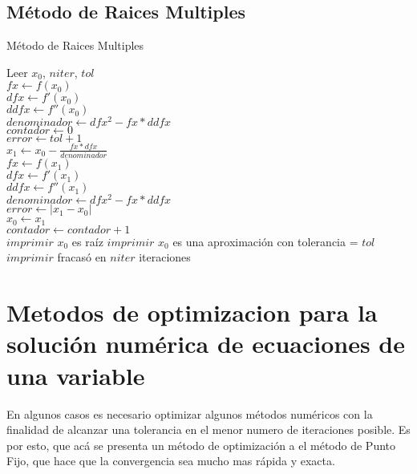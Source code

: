\documentclass[12pt]{article}
\begin{document}
    \subsection{Método de Raices Multiples}
    \begin{algorithm}[H]
        \caption{Método de Raices Multiples}
        \SetAlgoLined
        Leer $x_0$, $niter$, $tol$ \\
        $fx \leftarrow f(x_{0})$ \\
        $dfx \leftarrow f'(x_{0})$ \\
        $ddfx \leftarrow f''(x_{0})$ \\
        $denominador \leftarrow dfx^2 - fx * ddfx$\\
        $contador \leftarrow 0$ \\
        $error \leftarrow tol + 1$ \\
        {
            $x_{1} \leftarrow x_{0} - \frac{fx * dfx}{denominador}$ \\ 
            $fx \leftarrow f(x_{1})$ \\ 
            $dfx \leftarrow f'(x_{1})$ \\
            $ddfx \leftarrow f''(x_{1})$\\
            $denominador \leftarrow dfx^2 - fx * ddfx$\\
            $error \leftarrow |x_{1} - x_{0}|$\\
            $x_{0} \leftarrow x_{1}$\\
            $contador \leftarrow contador + 1$\\
        }
            {$imprimir$ $x_{0}$ es raíz}
            {$imprimir$ $x_{0}$ es una aproximación con tolerancia = $tol$}
            \Else
            {$imprimir$ fracasó en $niter$ iteraciones}
    \end{algorithm}


    \section{Metodos de optimizacion para la solución numérica de ecuaciones de una variable}
    En algunos casos es necesario optimizar algunos métodos numéricos con la finalidad de alcanzar una tolerancia en el menor numero de iteraciones posible. Es por esto, que acá se presenta un método de optimización a el método de Punto Fijo, que hace que la convergencia sea mucho mas rápida y exacta.
\end{document}
